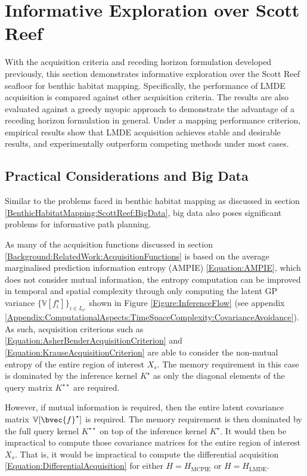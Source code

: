			
	\section{Informative Exploration over Scott Reef}
	\label{InformativeSeafloorExploration:ScottReef}
	
		With the acquisition criteria and receding horizon formulation developed previously, this section demonstrates informative exploration over the Scott Reef seafloor for benthic habitat mapping. Specifically, the performance of LMDE acquisition is compared against other acquisition criteria. The results are also evaluated against a greedy myopic approach to demonstrate the advantage of a receding horizon formulation in general. Under a mapping performance criterion, empirical results show that LMDE acquisition achieves stable and desirable results, and experimentally outperform competing methods under most cases.
		
		\subsection{Practical Considerations and Big Data}
		\label{InformativeSeafloorExploration:ScottReef:BigData}
		
			Similar to the problems faced in benthic habitat mapping as discussed in section \ref{BenthicHabitatMapping:ScottReef:BigData}, big data also poses significant problems for informative path planning.
			
			As many of the acquisition functions discussed in section \ref{Background:RelatedWork:AcquisitionFunctions} is based on the average marginalised prediction information entropy (AMPIE) \eqref{Equation:AMPIE}, which does not consider mutual information, the entropy computation can be improved in temporal and spatial complexity through only computing the latent GP variance $\{\mathbb{V}[f^{\star}_{i}]\}_{i \in I_{n^{\star}}}$ shown in Figure \ref{Figure:InferenceFlow} (see appendix \ref{Appendix:ComputationalAspects:TimeSpaceComplexity:CovarianceAvoidance}). As such, acquisition criterions such as \eqref{Equation:AsherBenderAcquisitionCriterion} and \eqref{Equation:KrauseAcquisitionCriterion} are able to consider the non-mutual entropy of the entire region of interest $X_{s}$. The memory requirement in this case is dominated by the inference kernel $K^{\star}$ as only the diagonal elements of the query matrix $K^{\star \star}$ are required. 
			
			However, if mutual information is required, then the entire latent covariance matrix $\mathbb{V}[\bvec{f}^{\star}]$ is required. The memory requirement is then dominated by the full query kernel $K^{\star \star}$ on top of the inference kernel $K^{\star}$. It would then be impractical to compute those covariance matrices for the entire region of interest $X_{s}$. That is, it would be impractical to compute the differential acquisition \eqref{Equation:DifferentialAcquisition} for either $H = H_{\mathrm{MCPIE}}$ or $H = H_{\mathrm{LMDE}}$.
			
